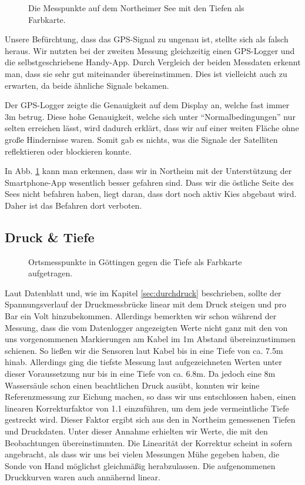 \documentclass[12pt,a4paper,titlepage,headinclude,bibtotoc]{scrartcl}
\numberwithin{equation}{subsection}
\begin{document}
\begin{figure}[!h]
	\centering
	
	\caption{Die Messpunkte auf dem Northeimer See mit den Tiefen als Farbkarte.}
	\label{fig:GPSNort}
\end{figure}

Unsere Befürchtung, dass das GPS-Signal zu ungenau ist, stellte sich als falsch heraus.
Wir nutzten bei der zweiten Messung gleichzeitig einen GPS-Logger und die selbstgeschriebene Handy-App.
Durch Vergleich der beiden Messdaten erkennt man, dass sie sehr gut miteinander übereinstimmen.
Dies ist vielleicht auch zu erwarten, da beide ähnliche Signale bekamen.

Der GPS-Logger zeigte die Genauigkeit auf dem Display an, welche fast immer 3m betrug.
Diese hohe Genauigkeit, welche sich unter "`Normalbedingungen"' nur selten erreichen lässt, wird dadurch erklärt, dass wir auf einer weiten Fläche ohne große Hindernisse waren.
Somit gab es nichts, was die Signale der Satelliten reflektieren oder blockieren konnte.

In Abb. \ref{fig:GPSNort} kann man erkennen, dass wir in Northeim mit der Unterstützung der Smart\-phone-App wesentlich besser gefahren sind.
Dass wir die östliche Seite des Sees nicht befahren haben, liegt daran, dass dort noch aktiv Kies abgebaut wird.
Daher ist das Befahren dort verboten.


\subsection{Druck \& Tiefe}
\label{sec:ausdruck}
\begin{figure}[!htb]
	\centering
	
	\caption{Ortsmesspunkte in Göttingen gegen die Tiefe als Farbkarte aufgetragen.}
	\label{fig:tiefeGoe}
\end{figure}
Laut Datenblatt und, wie im Kapitel \ref{sec:durchdruck} beschrieben, sollte der Spannungsverlauf der Druckmessbrücke linear mit dem Druck steigen und pro Bar ein Volt hinzubekommen.
Allerdings bemerkten wir schon während der Messung, dass die vom Datenlogger angezeigten Werte nicht ganz mit den von uns vorgenommenen Markierungen am Kabel im 1m Abstand übereinzustimmen schienen.
So ließen wir die Sensoren laut Kabel bis in eine Tiefe von ca. 7.5m hinab.
Allerdings ging die tiefste Messung laut aufgezeichneten Werten unter dieser Voraussetzung nur bis in eine Tiefe von ca. 6.8m.
Da jedoch eine 8m Wassersäule schon einen beachtlichen Druck ausübt, konnten wir keine Referenzmessung zur Eichung machen, so dass wir uns entschlossen haben, einen linearen Korrekturfaktor von 1.1 einzuführen, um dem jede vermeintliche Tiefe gestreckt wird.
Dieser Faktor ergibt sich aus den in Northeim gemessenen Tiefen und Druckdaten.
Unter dieser Annahme erhielten wir Werte, die mit den Beobachtungen übereinstimmten.
Die Linearität der Korrektur scheint in sofern angebracht, als dass wir uns bei vielen Messungen Mühe gegeben haben, die Sonde von Hand möglichst gleichmäßig herabzulassen.
Die aufgenommenen Druckkurven waren auch annähernd linear.
\end{document}
